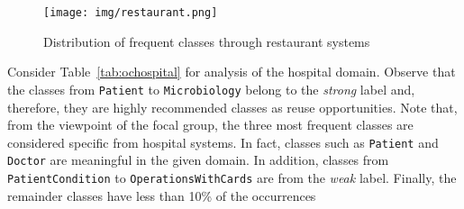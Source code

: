 \begin{figure}[!h]
\centering
\texttt{[image: img/restaurant.png]}
\caption{Distribution of frequent classes through restaurant systems}
\label{fig:restaurant}
\end{figure}



Consider Table~\ref{tab:ochospital} for analysis of the hospital domain. Observe that the classes from \texttt{Patient} to \texttt{Microbiology} belong to the \textit{strong} label and, therefore, they are highly recommended classes as reuse opportunities. Note that, from the viewpoint of the focal group, the three most frequent classes are considered specific from hospital systems. In fact, classes such as \texttt{Patient} and \texttt{Doctor} are meaningful in the given domain. In addition, classes from \texttt{PatientCondition} to \texttt{OperationsWithCards} are from the \textit{weak} label. Finally, the remainder classes have less than 10\% of the occurrences


